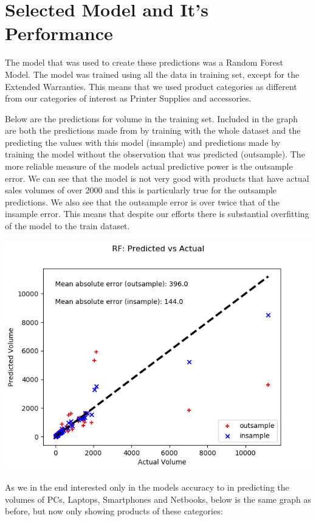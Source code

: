\documentclass[12pt,a4paper,leqno]{report}
\theoremstyle{plain}
\theoremstyle{definition}
\theoremstyle{remark}
\begin{document}
\section{Selected Model and It's Performance}

The model that was used to create these predictions was a Random Forest Model.
The model was trained using all the data in training set, except for the
Extended Warranties. This means that we used product categories as different
from our categories of interest as Printer Supplies and accessories.

Below are the predictions for volume in the training set. Included in the graph
are both the predictions made from by training with the whole dataset and the predicting
the values with this model (insample) and predictions made by training the model without
the observation that was predicted (outsample). The more reliable measure of the models
actual predictive power is the outsample error. We can see that the model is not very
good with products that have actual sales volumes of over 2000 and this is particularly
true for the outsample predictions. We also see that the outsample error is over twice that
of the insample error. This means that despite our efforts there is substantial overfitting
of the model to the train dataset.

\bigskip
{
    \centering
    \includegraphics[width=\textwidth,height=\textheight,keepaspectratio]{predictions_final_rf.png}
    \par
}
\bigskip

As we in the end interested only in the models accuracy to in predicting the volumes
of PCs, Laptops, Smartphones and Netbooks, below is the same graph as before, but now
only showing products of these categories:
\end{document}
